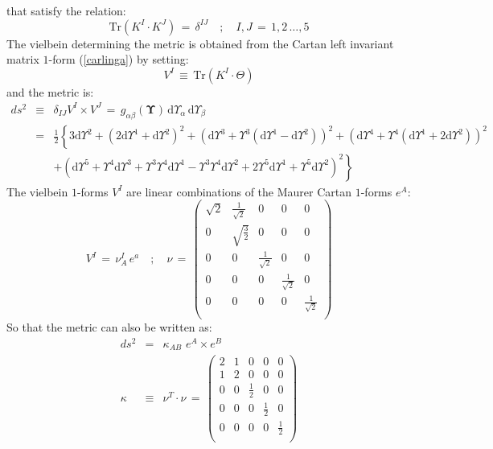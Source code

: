 \documentclass[10pt,a4paper]{article}
\begin{document}
that satisfy the relation:
\begin{equation}\label{kapponi}
  \mathrm{Tr} \left( K^I\cdot K^J\right) \, = \, \delta^{IJ} \quad ; \quad I,J\, = \, 1,2\,\dots, 5
\end{equation}
The vielbein determining the metric is obtained from the Cartan
left invariant matrix $1$-form (\ref{carlinga}) by setting:
\begin{equation}\label{viabidone}
  V^I \, \equiv \, \mathrm{Tr} \left( K^I \cdot \Theta\right)
\end{equation}
and the metric is:
\begin{eqnarray}\label{maggiorana}
  ds^2 & \equiv & \delta_{IJ} V^I \times V^J \, = \, g_{\alpha\beta} \left(\boldsymbol{\Upsilon}\right) \,\mathrm{d}\Upsilon_\alpha \, \mathrm{d}\Upsilon_\beta \nonumber\\
  &=&\frac{1}{2} \left\{3 \mathrm{d}\Upsilon^2+(2 \mathrm{d}\Upsilon
   ^1+\mathrm{d}\Upsilon^2)^2+(\mathrm{d}\Upsilon^3+\Upsilon^3
   (\mathrm{d}\Upsilon^1-\mathrm{d}\Upsilon^2))^2+(\mathrm{d}\Upsilon
   ^4+\Upsilon^4 (\mathrm{d}\Upsilon^1+2 \mathrm{d}\Upsilon
   ^2))^2\right.\nonumber\\
   &&\left. +(\mathrm{d}\Upsilon^5+\Upsilon^4 \mathrm{d}\Upsilon
   ^3+\Upsilon^3 \Upsilon^4 \mathrm{d}\Upsilon^1-\Upsilon
   ^3 \Upsilon^4 \mathrm{d}\Upsilon^2+2 \Upsilon^5
   \mathrm{d}\Upsilon^1+\Upsilon^5 \mathrm{d}\Upsilon^2)^2\right\}
\end{eqnarray}
The vielbein $1$-forms $V^I$ are linear combinations of the Maurer Cartan $1$-forms $e^A$:
\begin{equation}\label{nucrata}
  V^I\, = \, \nu^I_A \, e^a \quad ; \quad \nu \, = \, \left(
\begin{array}{ccccc}
 \sqrt{2} & \frac{1}{\sqrt{2}} & 0 & 0 & 0 \\
 0 & \sqrt{\frac{3}{2}} & 0 & 0 & 0 \\
 0 & 0 & \frac{1}{\sqrt{2}} & 0 & 0 \\
 0 & 0 & 0 & \frac{1}{\sqrt{2}} & 0 \\
 0 & 0 & 0 & 0 & \frac{1}{\sqrt{2}} \\
\end{array}
\right)
\end{equation}
So that the metric can also be written as:
\begin{eqnarray}\label{crisippo}
  ds^2 & =& \kappa_{AB}\, \, e^A \times e^B \nonumber\\
  \kappa & \equiv & \nu^T\cdot\nu \, = \, \left(
\begin{array}{ccccc}
 2 & 1 & 0 & 0 & 0 \\
 1 & 2 & 0 & 0 & 0 \\
 0 & 0 & \frac{1}{2} & 0 & 0 \\
 0 & 0 & 0 & \frac{1}{2} & 0 \\
 0 & 0 & 0 & 0 & \frac{1}{2} \\
\end{array}
\right)
\end{eqnarray}
\end{document}
